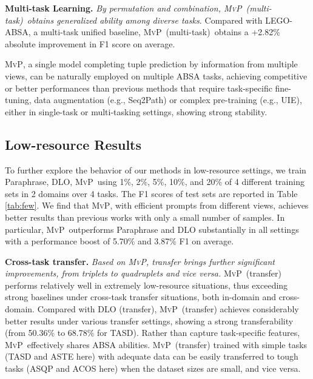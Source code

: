 \documentclass[11pt]{article}
\newcommand\mvp{\textsc{MvP}}
\newcommand\unimvp{\textsc{MvP}~{(multi-task)}}
\begin{document}
\textbf{Multi-task Learning.} 
\textit{By permutation and combination, \unimvp~obtains generalized ability among diverse tasks.}
Compared with LEGO-ABSA, a multi-task unified baseline, \unimvp~obtains a +2.82\%  absolute improvement in F1 score on average. 

\mvp, a single model completing tuple prediction by
information from multiple views, can be naturally employed on multiple ABSA tasks, achieving competitive or better performances than previous methods that require task-specific fine-tuning, data augmentation (e.g., Seq2Path) or complex pre-training (e.g., UIE), either in single-task or multi-tasking settings, showing strong stability.



\subsection{Low-resource Results}
\label{subsec:results:low-resource}
To further explore the behavior of our methods in low-resource settings, we train Paraphrase, DLO, \mvp~using 1\%, 2\%, 5\%, 10\%, and 20\% of 4 different training sets in 2 domains over 4 tasks. The F1 scores of test sets are reported in Table \ref{tab:few}. 
We find that \mvp, with efficient prompts from different views, achieves better results than previous works with only a small number of samples. In particular, \mvp~outperforms Paraphrase and DLO substantially in all settings with a performance boost of 5.70\% and 3.87\% F1 on average.

\textbf{Cross-task transfer.}
\textit{Based on \mvp, transfer brings further significant improvements, from triplets to quadruplets and vice versa.} \mvp~(transfer) performs relatively well in extremely low-resource situations, thus exceeding strong baselines under cross-task transfer situations, both in-domain and cross-domain. 
Compared with DLO (transfer), \mvp~(transfer) achieves considerably better results under various transfer settings, showing a strong transferability (from 50.36\% to 68.78\% for TASD). 
Rather than capture task-specific features, \mvp~effectively shares ABSA abilities. 
\mvp~(transfer) trained with simple tasks (TASD and ASTE here) with adequate data can be easily transferred to tough tasks (ASQP and ACOS here) when the dataset sizes are small, and vice versa. 
\end{document}
